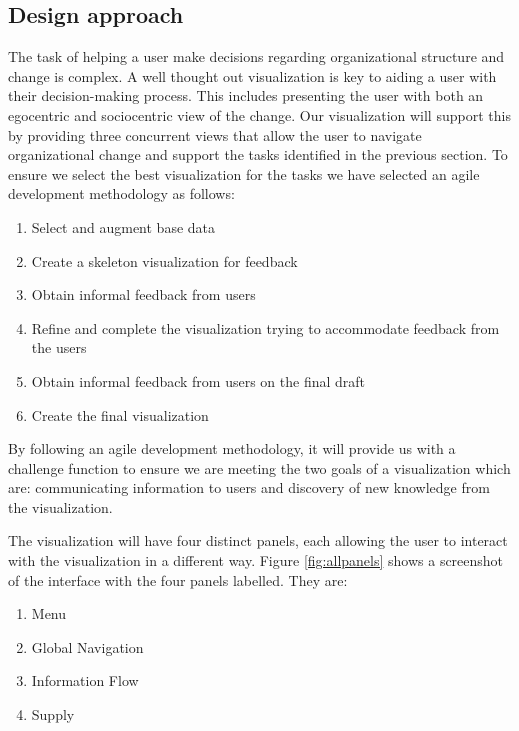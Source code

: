 \documentclass{soups}
\begin{document}
\subsection{Design approach}

The task of helping a user make decisions regarding organizational structure and change is complex.  A well thought out visualization is key to aiding a user with their decision-making process.  This includes presenting the user with both an egocentric and sociocentric view of the change.  Our visualization will support this by providing three concurrent views that allow the user to navigate organizational change and support the tasks identified in the previous section.  To ensure we select the best visualization for the tasks we have selected an agile development methodology as follows:

\begin{enumerate}
\item Select and augment base data
\item Create a skeleton visualization for feedback
\item Obtain informal feedback from users
\item Refine and complete the visualization trying to accommodate feedback from the users
\item Obtain informal feedback from users on the final draft
\item Create the final visualization
\end{enumerate}

By following an agile development methodology, it will provide us with a challenge function to ensure we are meeting the two goals of a visualization which are: communicating information to users and discovery of new knowledge from the visualization. 

The visualization will have four distinct panels, each allowing the user to interact with the visualization in a different way. Figure \ref{fig:allpanels} shows a screenshot of the interface with the four panels labelled. They are:
\begin{enumerate}
\item Menu
\item Global Navigation
\item Information Flow
\item Supply
\end{enumerate}
\end{document}
